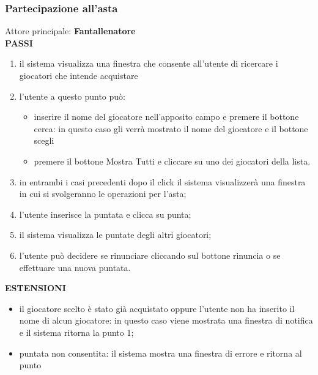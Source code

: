 \documentclass[12pt,a4paper]{article}
\begin{document}
\subsubsection*{Partecipazione all'asta}
Attore principale: \textbf{Fantallenatore}\\
\newline
\textbf{PASSI}
\begin{enumerate}
\item il sistema visualizza una finestra che consente all'utente di ricercare i giocatori che intende acquistare
\item l'utente  a questo punto può:
\begin{itemize}
\item inserire il nome del giocatore nell'apposito campo e premere il bottone cerca: in questo caso gli verrà mostrato il nome del giocatore e il bottone scegli
\item premere il bottone Mostra Tutti e cliccare su uno dei giocatori della lista.
\end{itemize}
\item in entrambi i casi precedenti dopo il click il sistema visualizzerà una finestra in cui si svolgeranno le operazioni per l'asta;
\item l'utente inserisce la puntata e clicca su punta;
\item il sistema visualizza le puntate degli altri giocatori;
\item l'utente può decidere se rinunciare cliccando sul bottone rinuncia o se effettuare una nuova puntata.
\end{enumerate}
\textbf{ESTENSIONI}
\begin{itemize}
\item il giocatore scelto è stato già acquistato oppure l'utente non ha inserito il nome di alcun giocatore: in questo caso viene mostrata una finestra di notifica e il sistema ritorna la punto 1;
\item puntata non consentita: il sistema mostra una finestra di errore e ritorna al punto 
\end{itemize}
\end{document}
